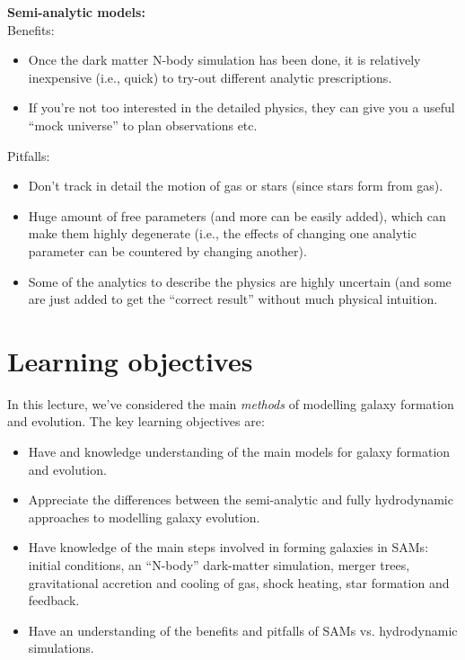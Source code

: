 \documentclass[11pt]{article}
\begin{document}
\noindent
{\bf Semi-analytic models:}\\
Benefits:
\begin{itemize}
\item Once the dark matter N-body simulation has been done, it is
  relatively inexpensive (i.e., quick) to try-out different analytic
  prescriptions.
\item If you're not too interested in the detailed physics, they can
  give you a useful ``mock universe'' to plan observations etc.
\end{itemize}
Pitfalls:
\begin{itemize}
\item Don't track in detail the motion of gas or stars (since stars
  form from gas).
\item Huge amount of free parameters (and more can be easily added),
  which can make them highly degenerate (i.e., the effects of changing
  one analytic parameter can be countered by changing another).
\item Some of the analytics to describe the physics are highly
  uncertain (and some are just added to get the ``correct result''
  without much physical intuition.
\end{itemize}

\section{Learning objectives}
In this lecture, we've considered the main {\it methods} of modelling
galaxy formation and evolution. The key learning objectives are:
\begin{itemize}
\item Have and knowledge understanding of the main models for galaxy
  formation and evolution.
\item Appreciate the differences between the semi-analytic and fully
  hydrodynamic approaches to modelling galaxy evolution.
\item Have knowledge of the main steps involved in forming galaxies in
  SAMs: initial conditions, an ``N-body'' dark-matter simulation,
  merger trees, gravitational accretion and cooling of gas, shock
  heating, star formation and feedback.
\item Have an understanding of the benefits and pitfalls of SAMs
  vs. hydrodynamic simulations.
\end{itemize}
\end{document}
